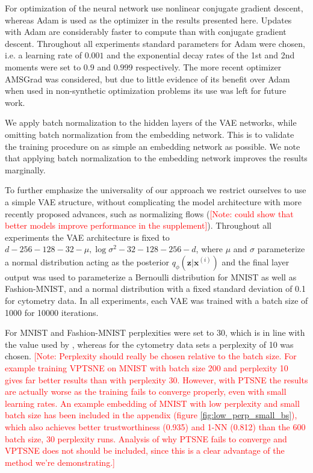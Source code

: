 For optimization of the neural network \cite{parametric_tsne} use nonlinear conjugate gradient descent, whereas Adam \citep{adam} is used as the optimizer in the results presented here. Updates with Adam are considerably faster to compute than with conjugate gradient descent. Throughout all experiments standard parameters for Adam were chosen, i.e. a learning rate of $0.001$ and the exponential decay rates of the 1st and 2nd moments were set to $0.9$ and $0.999$ respectively. The more recent optimizer AMSGrad \cite{on_the_convergence_of_adam} was considered, but due to little evidence of its benefit over Adam when used in non-synthetic optimization problems its use was left for future work.

We apply batch normalization \citep{batch_normalization} to the hidden layers of the VAE networks, while omitting batch normalization from the embedding network. This is to validate the training procedure on as simple an embedding network as possible. We note that applying batch normalization to the embedding network improves the results marginally.

To further emphasize the universality of our approach we restrict ourselves to use a simple VAE structure, without complicating the model architecture with more recently proposed advances, such as normalizing flows \citep{normalizing_flows} (\textcolor{red}{[Note: could show that better models improve performance in the supplement]}). Throughout all experiments the VAE architecture is fixed to $d - 256 - 128 - 32 - \mu, \log \sigma^2 - 32 - 128 - 256 - d$, where $\mu$ and $\sigma$ parameterize a normal distribution acting as the posterior $q_{\phi}(\mathbf{z} \vert \mathbf{x}^{(i)})$ and the final layer output was used to parameterize a Bernoulli distribution for MNIST as well as Fashion-MNIST, and a normal distribution with a fixed standard deviation of 0.1 for cytometry data. In all experiments, each VAE was trained with a batch size of 1000 for 10000 iterations.

For MNIST and Fashion-MNIST perplexities were set to 30, which is in line with the value used by \cite{parametric_tsne}, whereas for the cytometry data sets a perplexity of 10 was chosen. \textcolor{red}{[Note: Perplexity should really be chosen relative to the batch size. For example training VPTSNE on MNIST with batch size 200 and perplexity 10 gives far better results than with perplexity 30. However, with PTSNE the results are actually worse as the training fails to converge properly, even with small learning rates. An example embedding of MNIST with low perplexity and small batch size has been included in the appendix (figure \ref{fig:low_perp_small_bs}), which also achieves better trustworthiness (0.935) and 1-NN (0.812) than the 600 batch size, 30 perplexity runs. Analysis of why PTSNE fails to converge and VPTSNE does not should be included, since this is a clear advantage of the method we're demonstrating.]}

